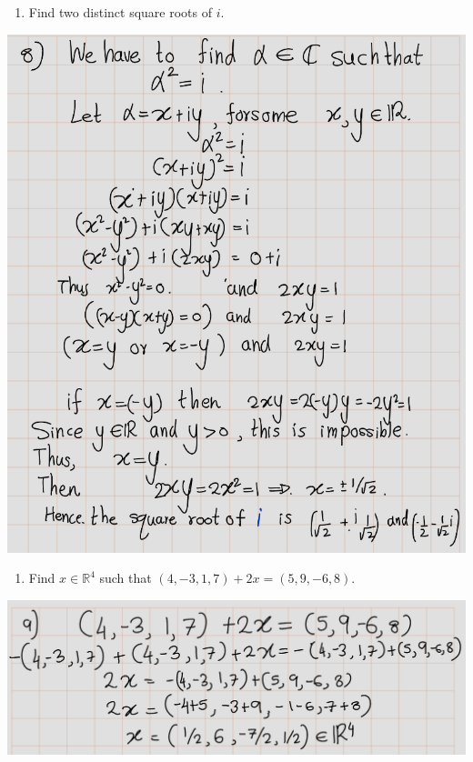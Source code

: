 \documentclass[
]{book}
\providecommand{\tightlist}{%
  \setlength{\itemsep}{0pt}\setlength{\parskip}{0pt}}
\theoremstyle{definition}
\theoremstyle{definition}
\theoremstyle{definition}
\theoremstyle{definition}
\theoremstyle{remark}
\begin{document}
\begin{enumerate}
\def\labelenumi{\arabic{enumi}.}
\setcounter{enumi}{7}
\tightlist
\item
  Find two distinct square roots of \(i\).
\end{enumerate}

\includegraphics{fig/Ex1A/Ex8.png}

\begin{enumerate}
\def\labelenumi{\arabic{enumi}.}
\setcounter{enumi}{8}
\tightlist
\item
  Find \(x \in \mathbb{R}^4\) such that \((4, -3, 1, 7) + 2x = (5, 9, -6, 8)\).
\end{enumerate}

\includegraphics{fig/Ex1A/Ex9.png}
\end{document}
